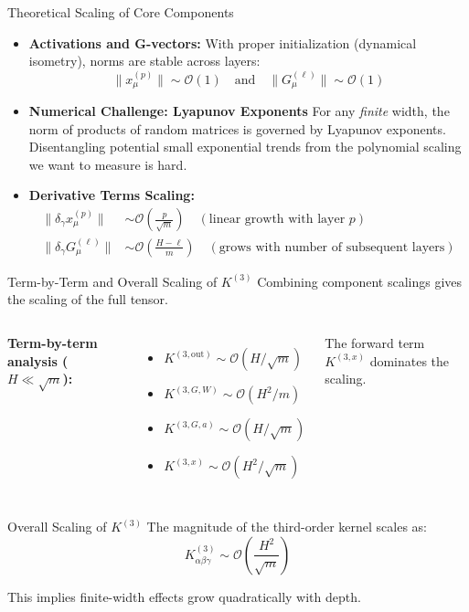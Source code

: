 \documentclass{beamer}
\newcommand{\Order}{\mathcal{O}}
\begin{document}
\begin{frame}{Theoretical Scaling of Core Components}
\begin{itemize}
    \item \textbf{Activations and G-vectors:}
    With proper initialization (dynamical isometry), norms are stable across layers:
    \[ \|x^{(p)}_\mu\| \sim \Order(1) \quad \text{and} \quad \|G^{(\ell)}_\mu\| \sim \Order(1) \]
    
    \item \textbf{Numerical Challenge: Lyapunov Exponents}
    For any \textit{finite} width, the norm of products of random matrices is governed by Lyapunov exponents. Disentangling potential small exponential trends from the polynomial scaling we want to measure is hard.
    
    \item \textbf{Derivative Terms Scaling:}
    \begin{align*}
    \|\delta_\gamma x^{(p)}_\mu\| &\sim \Order\left(\frac{p}{\sqrt{m}}\right) \quad (\text{linear growth with layer } p) \\
    \|\delta_\gamma G^{(\ell)}_\mu\| &\sim \Order\left(\frac{H-\ell}{m}\right) \quad (\text{grows with number of subsequent layers})
    \end{align*}
\end{itemize}
\end{frame}

\begin{frame}{Term-by-Term and Overall Scaling of $K^{(3)}$}
Combining component scalings gives the scaling of the full tensor.

\begin{columns}
\textbf{Term-by-term analysis ($H \ll \sqrt{m}$):}
\begin{itemize}
    \item $K^{(3, \text{out})} \sim \Order(H/\sqrt{m})$
    \item $K^{(3, G, W)} \sim \Order(H^2/m)$
    \item $K^{(3, G, a)} \sim \Order(H/\sqrt{m})$
    \item $K^{(3, x)} \sim \Order(H^2/\sqrt{m})$
\end{itemize}
The forward term $K^{(3,x)}$ dominates the scaling.
\end{columns}

\begin{alertblock}{Overall Scaling of $K^{(3)}$}
The magnitude of the third-order kernel scales as:
\begin{equation*}
K^{(3)}_{\alpha\beta\gamma} \sim \Order\left(\frac{H^2}{\sqrt{m}}\right)
\end{equation*}
\end{alertblock}
This implies finite-width effects grow quadratically with depth.
\end{frame}
\end{document}
